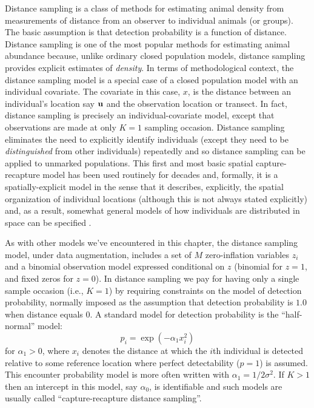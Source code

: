 Distance sampling is a class of methods for estimating animal density
from measurements of distance from an observer to individual animals
(or groups). The basic assumption is that detection probability is a
function of distance.  Distance sampling is one of the most popular
methods for estimating animal abundance \citep{burnham_etal:1980,
  buckland_etal:2001, buckland_etal:2004book} because, unlike ordinary
closed population models, distance sampling provides explicit
estimates of {\it density}.  In terms of methodological context, the
distance sampling model is a special case of a closed population model
with an individual covariate. The covariate in this case, $x$, is the
distance between an individual's location say ${\bf u}$ and the
observation location or transect. In fact, distance sampling is
precisely an individual-covariate model, except that observations are
made at only $K=1$ sampling occasion.
Distance sampling  eliminates the need to
explicitly identify individuals (except they need to be {\it
  distinguished} from other individuals) repeatedly and so distance
sampling can be applied to unmarked populations.
This first and most basic spatial
capture-recapture model has been used routinely for decades and,
formally, it is a spatially-explicit model in the sense that it
describes, explicitly, the spatial organization of individual
locations (although this is not always stated explicitly) and, as a
result, somewhat general models of how individuals are distributed in
space can be specified \citep{hedley_etal:1999, royle_etal:2004,
  johnson_etal:2010, niemi_fernandez:2010, sillett_etal:2012}.


As with other models we've encountered in this chapter, the distance sampling model, under data augmentation,
includes a set of $M$ zero-inflation variables $z_{i}$ and a
binomial observation model expressed conditional on $z$ (binomial for $z=1$, and
fixed zeros for $z=0$).  In distance sampling we pay for having only a
single sample occasion (i.e., $K=1$) by requiring constraints on the model of
detection probability, normally imposed as the assumption that
detection probability is $1.0$ when distance equals 0.  A standard
model for detection probability is the ``half-normal'' model:
\[
p_{i} = \exp(-\alpha_{1} x_{i}^{2})
\]
for $\alpha_{1} > 0$, 
where $x_i$ denotes the distance at which the $i$th
individual is detected relative to some reference location where
perfect detectability ($p=1$) is assumed. This encounter probability
model is more often written with
$\alpha_{1} =
1/2\sigma^{2}$.  If $K>1$ then an intercept in this model, say $\alpha_{0}$, is
identifiable and such models are usually called ``capture-recapture
distance sampling''\citep{alpizar_pollock:1996,borchers_etal:1998}.

